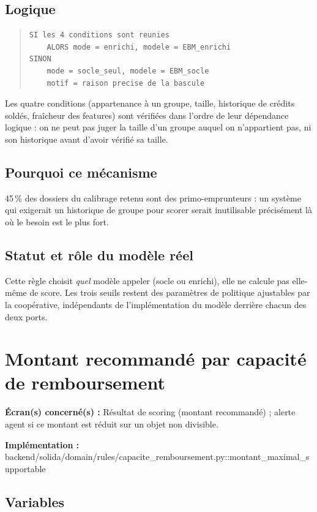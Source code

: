 \documentclass[11pt,a4paper]{article}
\newcommand{\brk}{\allowbreak}
\newcommand{\ecran}[1]{\noindent\textbf{Écran(s) concerné(s) :} #1\par}
\newcommand{\fichier}[1]{\noindent\textbf{Implémentation :} \tiny\ttfamily#1\normalfont\normalsize\par}
\newenvironment{formule}{\begin{quote}}{\end{quote}}
\begin{document}
\subsection*{Logique}
\begin{formule}
\begin{verbatim}
SI les 4 conditions sont reunies
    ALORS mode = enrichi, modele = EBM_enrichi
SINON
    mode = socle_seul, modele = EBM_socle
    motif = raison precise de la bascule
\end{verbatim}
\end{formule}
Les quatre conditions (appartenance à un groupe, taille, historique de crédits soldés, fraîcheur
des features) sont vérifiées dans l'ordre de leur dépendance logique : on ne peut pas juger la
taille d'un groupe auquel on n'appartient pas, ni son historique avant d'avoir vérifié sa taille.

\subsection*{Pourquoi ce mécanisme}
45\,\% des dossiers du calibrage retenu sont des primo-emprunteurs : un système qui exigerait un
historique de groupe pour scorer serait inutilisable précisément là où le besoin est le plus fort.

\subsection*{Statut et rôle du modèle réel}
Cette règle choisit \emph{quel} modèle appeler (socle ou enrichi), elle ne calcule pas elle-même
de score. Les trois seuils restent des paramètres de politique ajustables par la coopérative,
indépendants de l'implémentation du modèle derrière chacun des deux ports.

\newpage

\section{Montant recommandé par capacité de remboursement}
\label{sec:capacite}

\ecran{Résultat de scoring (montant recommandé) ; alerte agent si ce montant est réduit sur un
objet non divisible.}
\fichier{backend/\brk solida/\brk domain/\brk rules/\brk capacite\_remboursement.py::\brk{}montant\_maximal\_supportable}

\subsection*{Variables}
\end{document}
